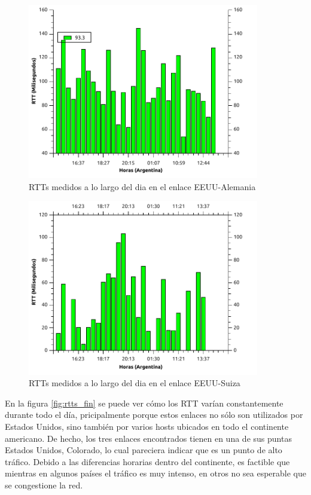 \begin{figure}[H]
  \centering
    \includegraphics[width=0.9\textwidth]{graficos/rtts_dia_inglaterra.pdf}
    \caption{RTTs medidos a lo largo del dia en el enlace EEUU-Alemania}
    \label{fig:rtts_ing}
\end{figure}

\begin{figure}[H]
  \centering
    \includegraphics[width=0.9\textwidth]{graficos/rtts_dia_finlandia.pdf}
    \caption{RTTs medidos a lo largo del dia en el enlace EEUU-Suiza}
    \label{fig:rtts_sud}
\end{figure}

En la figura \ref{fig:rtts_fin} se puede ver cómo los RTT varían constantemente durante todo el día, pricipalmente porque estos enlaces no sólo son utilizados por Estados Unidos, sino también por varios hosts ubicados en todo el continente americano. De hecho, los tres enlaces encontrados tienen en una de sus puntas Estados Unidos, Colorado, lo cual pareciera indicar que es un punto de alto tráfico. Debido a las diferencias horarias dentro del continente, es factible que mientras en algunos países el tráfico es muy intenso, en otros no sea esperable que se congestione la red. \\

